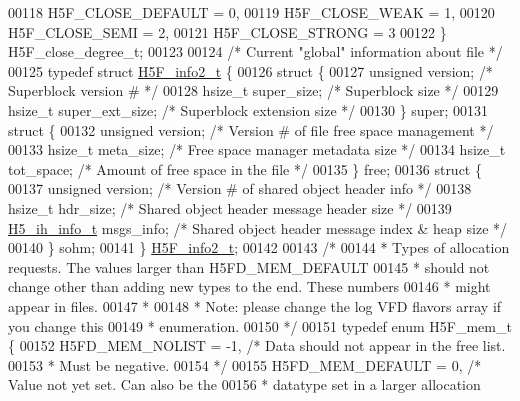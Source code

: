 \begin{DoxyCode}
00118     H5F\_CLOSE\_DEFAULT   = 0,
00119     H5F\_CLOSE\_WEAK      = 1,
00120     H5F\_CLOSE\_SEMI      = 2,
00121     H5F\_CLOSE\_STRONG    = 3
00122 \} H5F\_close\_degree\_t;
00123 
00124 \textcolor{comment}{/* Current "global" information about file */}
00125 \textcolor{keyword}{typedef} \textcolor{keyword}{struct }\hyperlink{struct_h5_f__info2__t}{H5F\_info2\_t} \{
00126     \textcolor{keyword}{struct }\{
00127     \textcolor{keywordtype}{unsigned}    version;    \textcolor{comment}{/* Superblock version # */}
00128     hsize\_t     super\_size; \textcolor{comment}{/* Superblock size */}
00129     hsize\_t     super\_ext\_size; \textcolor{comment}{/* Superblock extension size */}
00130     \} super;
00131     \textcolor{keyword}{struct }\{
00132     \textcolor{keywordtype}{unsigned}    version;    \textcolor{comment}{/* Version # of file free space management */}
00133     hsize\_t     meta\_size;  \textcolor{comment}{/* Free space manager metadata size */}
00134     hsize\_t     tot\_space;  \textcolor{comment}{/* Amount of free space in the file */}
00135     \} free;
00136     \textcolor{keyword}{struct }\{
00137     \textcolor{keywordtype}{unsigned}    version;    \textcolor{comment}{/* Version # of shared object header info */}
00138     hsize\_t     hdr\_size;       \textcolor{comment}{/* Shared object header message header size */}
00139     \hyperlink{struct_h5__ih__info__t}{H5\_ih\_info\_t}    msgs\_info;      \textcolor{comment}{/* Shared object header message index & heap size */}
00140     \} sohm;
00141 \} \hyperlink{struct_h5_f__info2__t}{H5F\_info2\_t};
00142 
00143 \textcolor{comment}{/*}
00144 \textcolor{comment}{ * Types of allocation requests. The values larger than H5FD\_MEM\_DEFAULT}
00145 \textcolor{comment}{ * should not change other than adding new types to the end. These numbers}
00146 \textcolor{comment}{ * might appear in files.}
00147 \textcolor{comment}{ *}
00148 \textcolor{comment}{ * Note: please change the log VFD flavors array if you change this}
00149 \textcolor{comment}{ * enumeration.}
00150 \textcolor{comment}{ */}
00151 \textcolor{keyword}{typedef} \textcolor{keyword}{enum} H5F\_mem\_t \{
00152     H5FD\_MEM\_NOLIST     = -1,   \textcolor{comment}{/* Data should not appear in the free list.}
00153 \textcolor{comment}{                                 * Must be negative.}
00154 \textcolor{comment}{                                 */}
00155     H5FD\_MEM\_DEFAULT    = 0,    \textcolor{comment}{/* Value not yet set.  Can also be the}
00156 \textcolor{comment}{                                 * datatype set in a larger allocation}

\end{DoxyCode}
